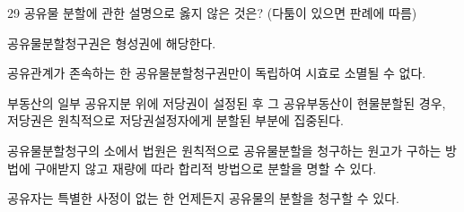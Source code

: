 \begin{question}{29}
공유물 분할에 관한 설명으로 옳지 않은 것은? (다툼이 있으면 판례에 따름)
\begin{choices}
  \item 공유물분할청구권은 형성권에 해당한다.
  \item 공유관계가 존속하는 한 공유물분할청구권만이 독립하여 시효로 소멸될 수 없다.
  \item 부동산의 일부 공유지분 위에 저당권이 설정된 후 그 공유부동산이 현물분할된 경우, 저당권은 원칙적으로 저당권설정자에게 분할된 부분에 집중된다.
  \item 공유물분할청구의 소에서 법원은 원칙적으로 공유물분할을 청구하는 원고가 구하는 방법에 구애받지 않고 재량에 따라 합리적 방법으로 분할을 명할 수 있다.
  \item 공유자는 특별한 사정이 없는 한 언제든지 공유물의 분할을 청구할 수 있다.
\end{choices}
\end{question}
